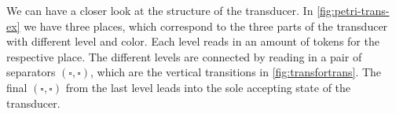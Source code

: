 %    	
%            	

We can have a closer look at the structure of the transducer. In \autoref{fig:petri-trans-ex} we have three places, which correspond to the three parts of the transducer with different level and color. Each level reads in an amount of tokens for the respective place. The different levels are connected by reading in a pair of separators $(\square,\square)$, which are the vertical transitions in \autoref{fig:transfortrans}. The final $(\square,\square)$ from the last level leads into the sole accepting state of the transducer.


